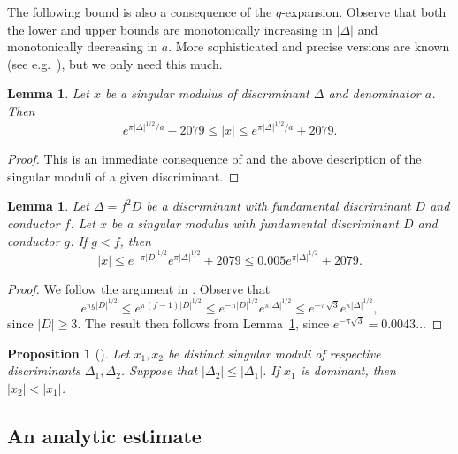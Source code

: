 \documentclass[12pt,a4paper,oneside]{amsart}
\newtheorem{lemma}[theorem]{Lemma}
\newtheorem{proposition}[theorem]{Proposition}
\begin{document}
	The following bound is also a consequence of the $q$-expansion. Observe that both the lower and upper bounds are monotonically increasing in $\lvert \Delta \rvert$ and monotonically decreasing in $a$. More sophisticated and precise versions are known (see e.g.~\cite[Lemma 2.5]{Pazuki19}), but we only need this much.
	
	\begin{lemma}\label{lem:bdsing}
		Let $x$ be a singular modulus of discriminant $\Delta$ and denominator $a$. Then
		\[ e^{\pi \lvert \Delta \rvert^{1/2}/a} - 2079 \leq \lvert x \rvert \leq e^{\pi \lvert \Delta \rvert^{1/2}/a} + 2079.\]
	\end{lemma}

\begin{proof}
	This is an immediate consequence of \cite[Lemma~1]{BiluMasserZannier13} and the above description of the singular moduli of a given discriminant.
\end{proof}

\begin{lemma}\label{lem:bdfund}
Let $\Delta = f^2 D$ be a discriminant with fundamental discriminant $D$ and conductor $f$. Let $x$ be a singular modulus with fundamental discriminant $D$ and conductor $g$. If $g<f$, then 
\[ \lvert x \rvert \leq e^{-\pi \lvert D \rvert^{1/2}} e^{\pi \lvert \Delta \rvert^{1/2}} + 2079 \leq 0.005 e^{\pi \lvert \Delta \rvert^{1/2}} + 2079.\]
\end{lemma}

\begin{proof}
    We follow the argument in \cite[\S4.2]{FayeRiffaut18}. Observe that
    \[e^{\pi g \lvert D \rvert^{1/2}} \leq e^{\pi (f - 1)\lvert D \rvert^{1/2}} \leq e^{-\pi \lvert D \rvert^{1/2}} e^{\pi \lvert \Delta \rvert^{1/2}} \leq e^{-\pi \sqrt{3}} e^{\pi \lvert \Delta \rvert^{1/2}}, \]
since $\lvert D \rvert \geq 3$. The result then follows from Lemma~\ref{lem:bdsing}, since $e^{-\pi \sqrt{3}} = 0.0043\ldots$
\end{proof}

\begin{proposition}[{\cite[Lemmata~5.1 \& 5.3]{BiluLucaMasser17}}]\label{prop:dombig}
Let $x_1, x_2$ be distinct singular moduli of respective discriminants $\Delta_1, \Delta_2$. Suppose that $\lvert \Delta_2 \rvert \leq \lvert \Delta_1 \rvert$. If $x_1$ is dominant, then $\lvert x_2 \rvert < \lvert x_1 \rvert$.
\end{proposition}



	
	\subsection{An analytic estimate}
\end{document}
